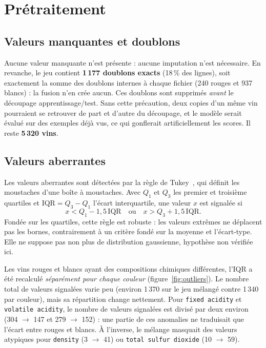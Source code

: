 \documentclass[11pt,a4paper]{article}
\newcommand{\code}[1]{\texttt{#1}}
\begin{document}
\section{Prétraitement}\label{sec:pretraitement}

\subsection{Valeurs manquantes et doublons}
Aucune valeur manquante n'est présente : aucune imputation n'est nécessaire. En revanche, le jeu contient \textbf{1\,177 doublons exacts} (18\,\% des lignes), soit exactement la somme des doublons internes à chaque fichier (240 rouges et 937 blancs) : la fusion n'en crée aucun. Ces doublons sont supprimés \emph{avant} le découpage apprentissage/test. Sans cette précaution, deux copies d'un même vin pourraient se retrouver de part et d'autre du découpage, et le modèle serait évalué sur des exemples déjà vus, ce qui gonflerait artificiellement les scores. Il reste \textbf{5\,320 vins}.

\subsection{Valeurs aberrantes}
Les valeurs aberrantes sont détectées par la règle de Tukey~\cite{tukey1977}, qui définit les moustaches d'une boîte à moustaches. Avec $Q_1$ et $Q_3$ les premier et troisième quartiles et $\mathrm{IQR} = Q_3 - Q_1$ l'écart interquartile, une valeur $x$ est signalée si
\begin{equation}
x < Q_1 - 1{,}5\,\mathrm{IQR} \quad \text{ou} \quad x > Q_3 + 1{,}5\,\mathrm{IQR}.
\end{equation}
Fondée sur les quartiles, cette règle est robuste : les valeurs extrêmes ne déplacent pas les bornes, contrairement à un critère fondé sur la moyenne et l'écart-type. Elle ne suppose pas non plus de distribution gaussienne, hypothèse non vérifiée ici.

Les vins rouges et blancs ayant des compositions chimiques différentes, l'IQR a été recalculé \emph{séparément pour chaque couleur} (figure~\ref{fig:outliers}). Le nombre total de valeurs signalées varie peu (environ 1\,370 sur le jeu mélangé contre 1\,340 par couleur), mais sa répartition change nettement. Pour \code{fixed acidity} et \code{volatile acidity}, le nombre de valeurs signalées est divisé par deux environ (304 $\to$ 147 et 279 $\to$ 152) : une partie de ces \og anomalies \fg{} ne traduisait que l'écart entre rouges et blancs. À l'inverse, le mélange masquait des valeurs atypiques pour \code{density} (3 $\to$ 41) ou \code{total sulfur dioxide} (10 $\to$ 59).
\end{document}
